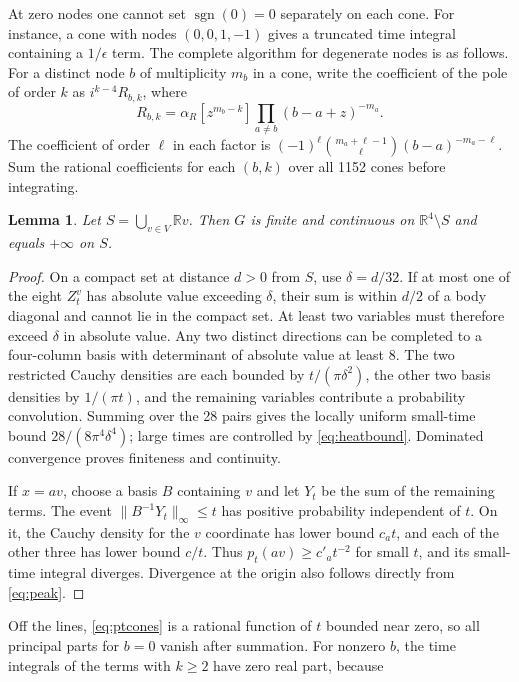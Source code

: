 \documentclass[11pt,a4paper]{article}
\newtheorem{lemma}[theorem]{Lemma}
\theoremstyle{remark}\newtheorem{remark}[theorem]{Remark}
\newcommand{\R}{\mathbb R}\newcommand{\dd}{\,\mathrm d}
\newcommand{\1}{\mathbf1}\newcommand{\pos}[1]{(#1)_+}
\DeclareMathOperator{\sgn}{sgn}\DeclareMathOperator{\rank}{rank}
\begin{document}
At zero nodes one cannot set $\sgn(0)=0$ separately on each cone. For instance, a cone with nodes $(0,0,1,-1)$ gives a truncated time integral containing a $1/\epsilon$ term. The complete algorithm for degenerate nodes is as follows. For a distinct node $b$ of multiplicity $m_b$ in a cone, write the coefficient of the pole of order $k$ as $i^{k-4}R_{b,k}$, where
\begin{equation}\label{eq:residue}
 R_{b,k}=\alpha_R[z^{m_b-k}]\prod_{a\ne b}(b-a+z)^{-m_a}.
\end{equation}
The coefficient of order $\ell$ in each factor is $(-1)^\ell\binom{m_a+\ell-1}{\ell}(b-a)^{-m_a-\ell}$. Sum the rational coefficients for each $(b,k)$ over all 1152 cones before integrating.

\begin{lemma}\label{lem:continuity}
Let $S=\bigcup_{v\in V}\R v$. Then $G$ is finite and continuous on $\R^4\setminus S$ and equals $+\infty$ on $S$.
\end{lemma}
\begin{proof}
On a compact set at distance $d>0$ from $S$, use $\delta=d/32$. If at most one of the eight $Z_t^v$ has absolute value exceeding $\delta$, their sum is within $d/2$ of a body diagonal and cannot lie in the compact set. At least two variables must therefore exceed $\delta$ in absolute value. Any two distinct directions can be completed to a four-column basis with determinant of absolute value at least 8. The two restricted Cauchy densities are each bounded by $t/(\pi\delta^2)$, the other two basis densities by $1/(\pi t)$, and the remaining variables contribute a probability convolution. Summing over the 28 pairs gives the locally uniform small-time bound $28/(8\pi^4\delta^4)$; large times are controlled by \eqref{eq:heatbound}. Dominated convergence proves finiteness and continuity.

If $x=av$, choose a basis $B$ containing $v$ and let $Y_t$ be the sum of the remaining terms. The event $\|B^{-1}Y_t\|_\infty\le t$ has positive probability independent of $t$. On it, the Cauchy density for the $v$ coordinate has lower bound $c_at$, and each of the other three has lower bound $c/t$. Thus $p_t(av)\ge c'_at^{-2}$ for small $t$, and its small-time integral diverges. Divergence at the origin also follows directly from \eqref{eq:peak}.
\end{proof}
Off the lines, \eqref{eq:ptcones} is a rational function of $t$ bounded near zero, so all principal parts for $b=0$ vanish after summation. For nonzero $b$, the time integrals of the terms with $k\ge2$ have zero real part, because
\end{document}
